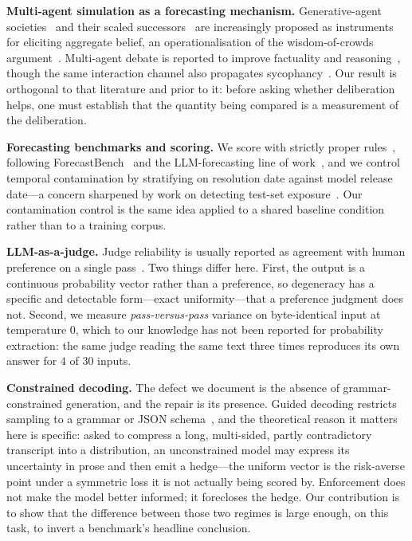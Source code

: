 \documentclass[10pt,conference]{IEEEtran}
\begin{document}
\textbf{Multi-agent simulation as a forecasting mechanism.} Generative-agent societies~\cite{park2023generative} and their scaled successors~\cite{oasis2024,mirofish2024} are increasingly proposed as instruments for eliciting aggregate belief, an operationalisation of the wisdom-of-crowds argument~\cite{surowiecki2005}. Multi-agent debate is reported to improve factuality and reasoning~\cite{du2023debate}, though the same interaction channel also propagates sycophancy~\cite{sharma2023sycophancy}. Our result is orthogonal to that literature and prior to it: before asking whether deliberation helps, one must establish that the quantity being compared is a measurement of the deliberation.

\textbf{Forecasting benchmarks and scoring.} We score with strictly proper rules~\cite{gneiting2007}, following ForecastBench~\cite{karger2024forecastbench} and the LLM-forecasting line of work~\cite{halawi2024approaching}, and we control temporal contamination by stratifying on resolution date against model release date---a concern sharpened by work on detecting test-set exposure~\cite{oren2024proving}. Our contamination control is the same idea applied to a shared baseline condition rather than to a training corpus.

\textbf{LLM-as-a-judge.} Judge reliability is usually reported as agreement with human preference on a single pass~\cite{zheng2023judging}. Two things differ here. First, the output is a continuous probability vector rather than a preference, so degeneracy has a specific and detectable form---exact uniformity---that a preference judgment does not. Second, we measure \emph{pass-versus-pass} variance on byte-identical input at temperature $0$, which to our knowledge has not been reported for probability extraction: the same judge reading the same text three times reproduces its own answer for $4$ of $30$ inputs.

\textbf{Constrained decoding.} The defect we document is the absence of grammar-constrained generation, and the repair is its presence. Guided decoding restricts sampling to a grammar or JSON schema~\cite{vllm_guided,vllm}, and the theoretical reason it matters here is specific: asked to compress a long, multi-sided, partly contradictory transcript into a distribution, an unconstrained model may express its uncertainty in prose and then emit a hedge---the uniform vector is the risk-averse point under a symmetric loss it is not actually being scored by. Enforcement does not make the model better informed; it forecloses the hedge. Our contribution is to show that the difference between those two regimes is large enough, on this task, to invert a benchmark's headline conclusion.
\end{document}
